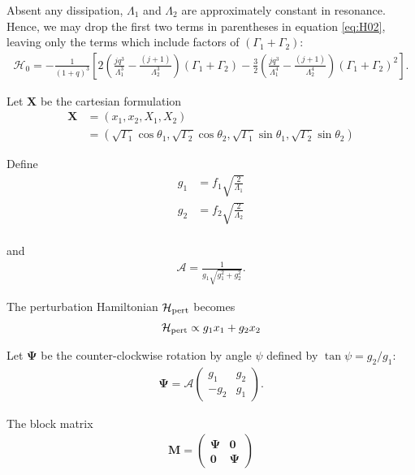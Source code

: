 \documentclass[usenatbib]{mnras}
\renewcommand{\v}[1]{\boldsymbol{ #1 }}
\begin{document}
\noindent Absent any dissipation, \(\Lambda_1\) and
\(\Lambda_2\) are approximately constant in resonance.  Hence, we may
drop the first two terms in parentheses in equation \eqref{eq:H02},
leaving only the terms which include factors of \((\Gamma_1+\Gamma_2)\):
\begin{align}
  \label{eq:H03}
  \mathcal{H}_0
  = -\frac{1}{(1+q)^3}\left[
   2\left(
     \frac{jq^3}{\Lambda_1^3} - \frac{(j+1)}{\Lambda_2^3}
     \right)(\Gamma_1+\Gamma_2)
   -\frac32\left( 
     \frac{jq^3}{\Lambda_1^4} - \frac{(j+1)}{\Lambda_2^4}\right)
     (\Gamma_1+\Gamma_2)^2
     \right].
\end{align}

Let \(\v X\) be the cartesian formulation
\begin{align}
  \v X &= (x_1, x_2, X_1, X_2)\nonumber\\
  &= (\sqrt{\Gamma_1}\cos\theta_1, \sqrt{\Gamma_2}\cos\theta_2,
    \sqrt{\Gamma_1}\sin\theta_1, \sqrt{\Gamma_2}\sin\theta_2)
\end{align}

\noindent 
Define
\begin{align}
    g_1 &= f_1\sqrt{\frac{2}{\Lambda_1}} \\
    g_2 &= f_2\sqrt{\frac{2}{\Lambda_2}} \\
\end{align}

\noindent and
\begin{align}
  \mathcal{A} = \frac{1}{g_1\sqrt{g_1^2+g_2^2}}.
\end{align}

\noindent The perturbation Hamiltonian \(\mathcal H_{\rm
pert}\) becomes
\begin{align}
  \mathcal H_{\rm pert} \propto g_1 x_1 + g_2 x_2
\end{align}

\noindent
Let \(\v \Psi\) be the
counter-clockwise rotation by angle \(\psi\) defined by \(\tan\psi=
g_2/g_1\):
\begin{align}
  \v \Psi =  \mathcal{A}
  \begin{pmatrix}
    g_1 & g_2 \\
    -g_2 & g_1 
  \end{pmatrix}.
\end{align}

\noindent The block matrix
\begin{align}
  \v M =
  \begin{pmatrix}
    \v \Psi & \v 0 \\
    \v 0 & \v \Psi
  \end{pmatrix}
\end{align}
\end{document}
